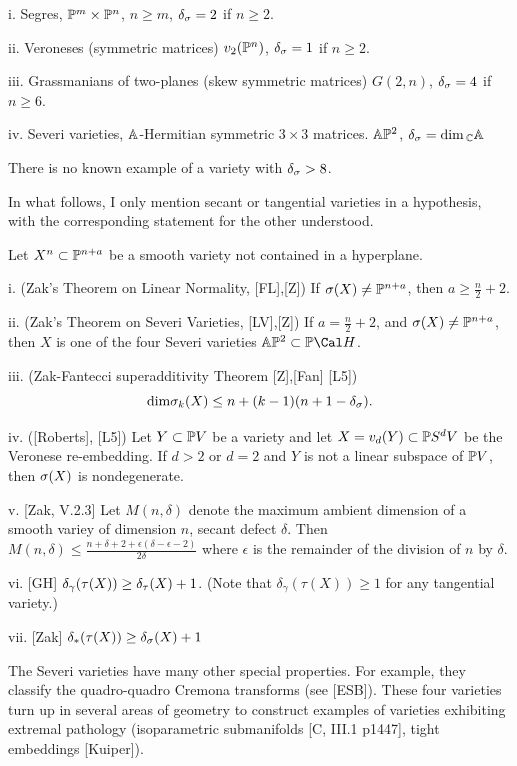 i. Segres, $\Bbb P^{m}\times \Bbb P^{n}$, $n\geq m$, $\delta_{\sigma} = 2$ if $n\geq 2$.

ii. Veroneses (symmetric matrices) $v_2(\Bbb P^{n})$,  $\delta_{\sigma} = 1$ if $n\geq
2$.

iii. Grassmanians of two-planes  (skew symmetric matrices) $G(2,n)$,
$\delta_{\sigma} =
4$ if
$n\geq 6$.

iv. Severi varieties, $\Bbb A$-Hermitian symmetric
$3\times 3$  matrices. $\Bbb A\Bbb P^{2}$,  $\delta_{\sigma} = \text{dim}\,_{\Bbb C}\Bbb A$

There is no known example of a variety with $\delta_{\sigma} >8$. 


 

In what follows, I only mention secant or tangential varieties in a
hypothesis, with the corresponding statement for the other understood. 
 

Let $X^n\subset
 \Bbb P^{n+a}$ be a smooth  variety not contained in a hyperplane.

i. (Zak's Theorem on Linear Normality, [FL],[Z])  If  $\sigma
(X)\neq  \Bbb P^{n+a}$, then $a\geq \frac{n}{2}+2$.

 
ii. (Zak's Theorem on Severi Varieties,   [LV],[Z])   If $a=\frac{n}{2}+2$,
and    $\sigma
(X)\neq  \Bbb P^{n+a}$,
then $X$ is one of
the four Severi varieties $\Bbb A\pp 2\subset\ppp \Cal H$.
 

iii. (Zak-Fantecci superadditivity Theorem [Z],[Fan]
 [L5])   
$$
\text{dim}\sigma_k(X)\leq n+ (k-1)(n+1-\delta_{\sigma}).
$$
 

iv.  ([Roberts], [L5])
Let $Y\subset \Bbb P V$ be a variety and let
$X=v_d(Y)\subset\Bbb P S^dV$ be the Veronese re-embedding.
If $d>2$ or
$d=2$ and $Y$ is not a linear subspace of $\Bbb P V$,
then $\sigma (X)$ is nondegenerate.

 

v. [Zak, V.2.3] Let $M(n,\delta )$ denote the maximum ambient dimension
of a smooth variey of dimension $n$, secant defect $\delta$. Then
$M(n,\delta )\leq \frac{n+\delta+2 +\epsilon (\delta -\epsilon
-2)}{2\delta}$
where $\epsilon$ is the remainder of the division of $n$ by $\delta$.  


vi. [GH]    $\delta_{\gamma}(\tau (X))\geq \delta_{\tau} (X)+1$. (Note
that $\delta_{\gamma}(\tau (X))\geq 1$ for any tangential variety.)

vii. [Zak] $\delta_{*} (\tau (X))\geq \delta_{\sigma}(X)+1$
 
\endproclaim
 


The     Severi varieties   have many other special properties. For example,
they classify the quadro-quadro Cremona transforms
(see [ESB]).  These four varieties turn up in several areas of
geometry to construct examples of varieties
 exhibiting extremal pathology (isoparametric submanifolds [C, III.1
p1447],
tight embeddings [Kuiper]).
 

